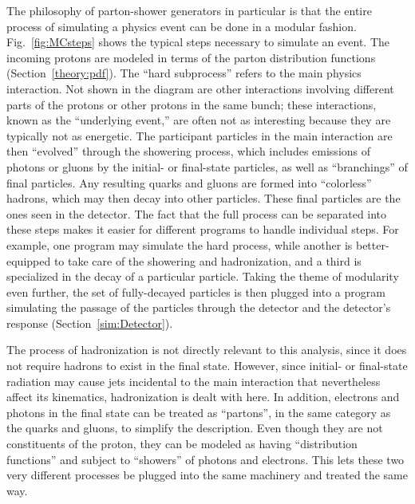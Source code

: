 The philosophy of parton-shower generators 
in particular 
is that the entire process of simulating 
a physics event can be done in a modular fashion.  
Fig.~\ref{fig:MCsteps} 
shows the typical steps necessary to simulate an event.  
The incoming protons are modeled in terms of the 
parton distribution functions (Section~\ref{theory:pdf}).  
The ``hard subprocess'' refers to the main 
physics interaction.  
Not shown in the diagram are other interactions 
involving different parts of the protons 
or other protons in the same bunch; 
these interactions, known as the ``underlying event,''  
are often not as interesting 
because they are typically not as energetic.  
The participant particles in the main interaction 
are then ``evolved'' through the showering process, 
which includes emissions of photons or gluons 
by the initial- or final-state particles, 
as well as ``branchings'' of final particles. %
Any resulting quarks and gluons are 
formed into ``colorless'' hadrons, %
which may then decay into other particles. 
These final particles are the ones seen 
in the detector.  
The fact that the full process can be separated 
into these steps 
makes it easier for different programs 
to handle individual steps.  
For example, one program may simulate the 
hard process, 
while another is better-equipped to take care 
of the showering and hadronization, 
and a third is specialized in the decay of 
a particular particle.  
Taking the theme of modularity even further, 
the set of fully-decayed particles 
is then plugged into a program simulating 
the passage of the particles through the detector 
and the detector's response (Section~\ref{sim:Detector}).  

The process of hadronization is not directly 
relevant to this analysis, 
since it does not require hadrons to 
exist in the final state.  
However, since initial- or final-state radiation 
may cause jets incidental to the main interaction 
that nevertheless affect its kinematics, 
hadronization is dealt with here.  
In addition, 
electrons and photons in the final state 
can be treated as ``partons'', 
in the same category as the quarks and gluons, 
to simplify the description.  
Even though they are not constituents of the proton, 
they can be modeled as having 
``distribution functions'' 
and subject to ``showers'' of 
photons and electrons. 
This lets these two very different processes be 
plugged into the same machinery and treated the same way.  

